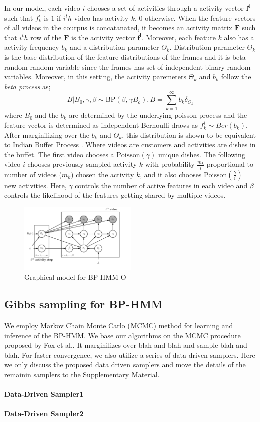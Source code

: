 In our model, each video $i$ chooses a set of activities through a activity vector $\mathbf{f^i}$ such that $f^i_k$ is $1$ if $i^th$ video has activity $k$, 0 otherwise. When the feature vectors of all videos in the courpus is concatanated, it becomes an activity matrix $\mathbf{F}$ such that $i^th$ row of the $\mathbf{F}$ is the activity vector $\mathbf{f^i}$. Moreover, each feature $k$ also has a activity frequency $b_k$  and a distribution parameter $\Theta_k$. Distribution parameter $\Theta_k$ is the base distribution of the feature distributions of the frames and it is beta random random variable since the frames has set of independent binary random variables. Moreover, in this setting, the activity paremeters $\Theta_k$ and $b_k$ follow the \emph{beta process} as;
\begin{equation}
  B|B_0,\gamma,\beta \sim \text{BP}(\beta,\gamma B_o), B=\sum_{k=1}^\infty b_k \delta_{\Theta_k}
\end{equation}
where $B_0$ and the $b_k$ are determined by the underlying poisson process \cite{hbp} and the feature vector is determined as independent Bernoulli draws as $f_{k}^i \sim Ber(b_k)$. After marginilizing over the $b_k$ and $\Theta_k$, this distribution is shown to be equivalent to Indian Buffet Process \cite{bpibp}. Where videos are customers and activities are dishes in the buffet. The first video chooses a $\text{Poisson}(\gamma)$ unique dishes. The following video $i$ chooses previously sampled activity $k$ with probability $\frac{m_k}{i}$ proportional to number of videos ($m_k$) chosen the activity $k$, and it also chooses $\text{Poisson}(\frac{\gamma}{i})$ new activities. Here, $\gamma$ controls the number of active features in each video and $\beta$ controls the likelihood of the features getting shared by multiple videos.

\begin{figure}[h!]
  \includegraphics[width=0.5\textwidth]{plate}
  \caption{Graphical model for BP-HMM-O}
  \label{bphmmo}
\end{figure}


\subsection{Gibbs sampling for BP-HMM}
We employ Markov Chain Monte Carlo (MCMC) method for learning and inference of the BP-HMM. We base our algorithms on the MCMC procedure proposed by Fox et al.\cite{foxBPHMM}. It marginilizes over blah and blah and sample blah and blah. For faster convergence, we also utilize a series of data driven samplers. Here we only discuss the proposed data driven samplers and move the details of the remainin samplers to the Supplementary Material.

\paragraph{Data-Driven Sampler1}
\paragraph{Data-Driven Sampler2}
